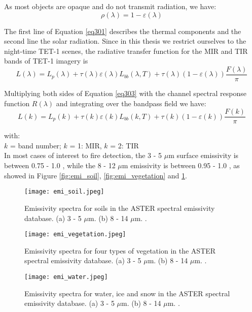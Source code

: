 \noindent As most objects are opaque and do not transmit radiation, we have:
\begin{equation}
\label{eq302}
\rho (\lambda) = 1 - \varepsilon (\lambda)
\end{equation}

\noindent The first line of Equation \eqref{eq301} describes the thermal components and the second line the solar radiation. Since in this thesis we restrict ourselves to the night-time TET-1 scenes, the radiative transfer function for the MIR and TIR bands of TET-1 imagery is
\begin{equation}
\label{eq303}
L(\lambda) = L_p(\lambda) + \tau (\lambda) \varepsilon (\lambda) L_{bb}(\lambda, T) + \tau (\lambda) (1 - \varepsilon (\lambda)) \frac{F(\lambda)}{\pi}
\end{equation}

\noindent Multiplying both sides of Equation \eqref{eq303} with the channel spectral response function $R(\lambda)$ and integrating over the bandpass field we have:
\begin{equation}
\label{eq304}
L(k) = L_p(k) + \tau (k) \varepsilon (k) L_{bb}(k, T) + \tau (k) (1 - \varepsilon (k)) \frac{F(k)}{\pi}
\end{equation}

\noindent with:\\
\indent $k$ = band number; $k$ = 1: MIR, $k$ = 2: TIR\\

\noindent In most cases of interest to fire detection, the 3 - 5 $\mu$m surface emissivity is between 0.75 - 1.0 \parencite{Reference301}, while the 8 - 12 $\mu$m emissivity is between 0.95 - 1.0 \parencite{Reference302}, as showed in Figure \ref{fig:emi_soil}, \ref{fig:emi_vegetation} and \ref{fig:emi_water}.\\

\begin{figure}[!htbp]
  \centering\texttt{[image: emi\_soil.jpeg]}
  \caption{Emissivity spectra for soils in the ASTER spectral emissivity database. (a) 3 - 5 $\mu$m. (b) 8 - 14 $\mu$m. \parencite{Reference303}.}
  \label{fig:emi_soil}
  
  \centering\texttt{[image: emi\_vegetation.jpeg]}
  \caption{Emissivity spectra for four types of vegetation in the ASTER spectral emissivity database. (a) 3 - 5 $\mu$m. (b) 8 - 14 $\mu$m. \parencite{Reference303}.}
  \label{fig:emi_vegetation}
  
  \centering\texttt{[image: emi\_water.jpeg]}
  \caption{Emissivity spectra for water, ice and snow in the ASTER spectral emissivity database. (a) 3 - 5 $\mu$m. (b) 8 - 14 $\mu$m. \parencite{Reference303}.}
  \label{fig:emi_water}
\end{figure}

